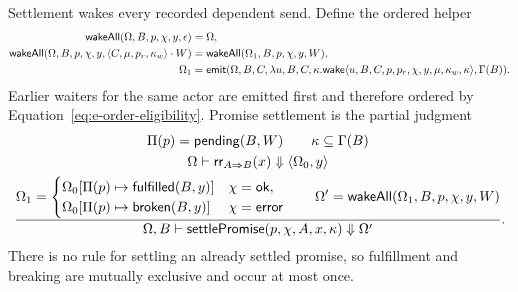 Settlement wakes every recorded dependent send.  Define the ordered helper
{\small
\begin{equation}\label{eq:wake-all}
\begin{aligned}
 \mathsf{wakeAll}(\Omega,B,p,\chi,y,\epsilon)&=\Omega,\\
 \mathsf{wakeAll}(\Omega,B,p,\chi,y,
    \langle C,\mu,p_r,\kappa_w\rangle\cdot W)
   &=\mathsf{wakeAll}(\Omega_1,B,p,\chi,y,W),\\
 \Omega_1&=\mathsf{emit}(\Omega,B,C,
   \lambda u,B,C,\kappa.\mathsf{wake}\langle
      u,B,C,p,p_r,\chi,y,\mu,\kappa_w,\kappa\rangle,\Gamma(B)).
\end{aligned}
\end{equation}}
Earlier waiters for the same actor are emitted first and therefore ordered by
Equation~\eqref{eq:e-order-eligibility}.  Promise settlement is the partial
judgment
{\small
\begin{equation}\label{eq:promise-settlement}
\dfrac{\begin{gathered}
 \Pi(p)=\mathsf{pending}(B,W)\qquad \kappa\subseteq\Gamma(B)\\
 \Omega\vdash\mathsf{rr}_{A\Rightarrow B}(x)
    \Downarrow\langle\Omega_0,y\rangle\\
 \Omega_1=
 \begin{cases}
  \Omega_0[\Pi(p)\mapsto\mathsf{fulfilled}(B,y)]&\chi=\mathsf{ok},\\
  \Omega_0[\Pi(p)\mapsto\mathsf{broken}(B,y)]&\chi=\mathsf{error}
 \end{cases}
 \qquad \Omega'=\mathsf{wakeAll}(\Omega_1,B,p,\chi,y,W)
\end{gathered}}
 {\Omega,B\vdash\mathsf{settlePromise}(p,\chi,A,x,\kappa)
    \Downarrow\Omega'}.
\end{equation}}
There is no rule for settling an already settled promise, so fulfillment and
breaking are mutually exclusive and occur at most once.

